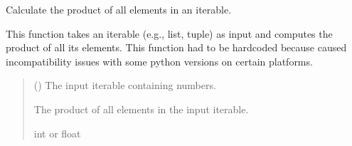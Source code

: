\documentclass[letterpaper,10pt,english]{sphinxmanual}
\begin{document}
\begin{fulllineitems}
\label{\detokenize{documentation:loanpy.utils.prod}}
\pysigstartsignatures
{}
\pysigstopsignatures
\sphinxAtStartPar
Calculate the product of all elements in an iterable.

\sphinxAtStartPar
This function takes an iterable (e.g., list, tuple) as input and computes
the product of all its elements. This function had to be hard\sphinxhyphen{}coded
because  caused incompatibility issues with some
python versions on certain platforms.
\begin{quote}\begin{description}
\sphinxAtStartPar
{} (\sphinxstyleliteralemphasis{\sphinxupquote{{[}}}\sphinxstyleliteralemphasis{\sphinxupquote{{]} or }}\sphinxstyleliteralemphasis{\sphinxupquote{{[}}}\sphinxstyleliteralemphasis{\sphinxupquote{{]}}}) \textendash{} The input iterable containing numbers.

\sphinxAtStartPar
The product of all elements in the input iterable.

\sphinxAtStartPar
int or float

\end{description}\end{quote}

\sphinxAtStartPar
{}

\begin{sphinxVerbatim}[commandchars=\\\{\}]
   
\PYG{p}{[}  \PYG{p}{]}  
\end{sphinxVerbatim}

\end{fulllineitems}
\end{document}

